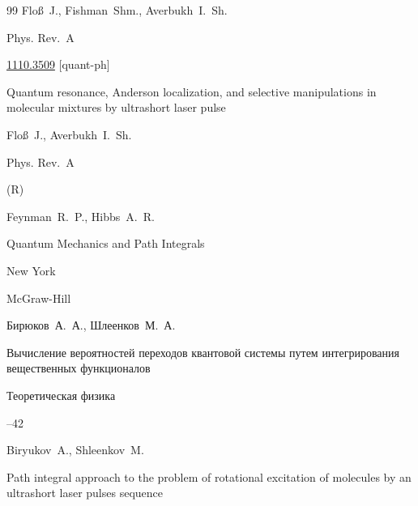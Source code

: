 \begin{thebibliography}{99}
\by  Flo\ss~J.,  Fishman~Shm., Averbukh~I.~Sh.

\jour Phys. Rev.~A









\arxiv \href{http://arxiv.org/abs/1110.3509}{1110.3509} [quant-ph]

\paper Quantum resonance, Anderson localization, and selective manipulations in molecular mixtures by ultrashort laser pulse 

\by Flo\ss~J., Averbukh~I.~Sh.  

\jour Phys. Rev.~A




(R)





\by Feynman~R.~P., Hibbs~A.~R. 


\book Quantum Mechanics and Path Integrals

\publaddr New York

\publ McGraw-Hill




\by Бирюков~А.~А., Шлеенков~М.~А.

\paper Вычисление вероятностей переходов квантовой системы путем интегрирования вещественных функционалов 

\jour Теоретическая физика



--42





\by Biryukov~A., Shleenkov~M.

\preprint  Path integral approach to the problem of rotational excitation of molecules by an ultrashort laser pulses sequence 


\end{thebibliography}
